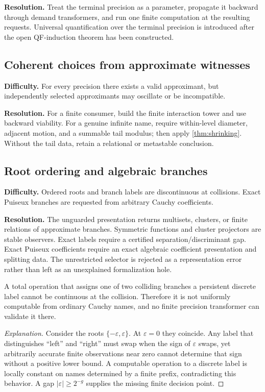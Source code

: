 \textbf{Resolution.}  Treat the terminal precision as a parameter, propagate it backward through demand transformers, and run one finite computation at the resulting requests.  Universal quantification over the terminal precision is introduced after the open QF-induction theorem has been constructed.

\subsection{Coherent choices from approximate witnesses}

\textbf{Difficulty.}  For every precision there exists a valid approximant, but independently selected approximants may oscillate or be incompatible.

\textbf{Resolution.}  For a finite consumer, build the finite interaction tower and use backward viability.  For a genuine infinite name, require within-level diameter, adjacent motion, and a summable tail modulus; then apply \cref{thm:shrinking}.  Without the tail data, retain a relational or metastable conclusion.

\subsection{Root ordering and algebraic branches}

\textbf{Difficulty.}  Ordered roots and branch labels are discontinuous at collisions.  Exact Puiseux branches are requested from arbitrary Cauchy coefficients.

\textbf{Resolution.}  The unguarded presentation returns multisets, clusters, or finite relations of approximate branches.  Symmetric functions and cluster projectors are stable observers.  Exact labels require a certified separation/discriminant gap.  Exact Puiseux coefficients require an exact algebraic coefficient presentation and splitting data.  The unrestricted selector is rejected as a representation error rather than left as an unexplained formalization hole.

\begin{barrier}
A total operation that assigns one of two colliding branches a persistent discrete label cannot be continuous at the collision.  Therefore it is not uniformly computable from ordinary Cauchy names, and no finite precision transformer can validate it there.
\end{barrier}

\begin{proof}[Explanation]
Consider the roots \(\{ -\varepsilon,\varepsilon\}\).  At \(\varepsilon=0\) they coincide.  Any label that distinguishes ``left'' and ``right'' must swap when the sign of \(\varepsilon\) swaps, yet arbitrarily accurate finite observations near zero cannot determine that sign without a positive lower bound.  A computable operation to a discrete label is locally constant on names determined by a finite prefix, contradicting this behavior.  A gap \(|\varepsilon|\ge2^{-g}\) supplies the missing finite decision point.
\end{proof}


